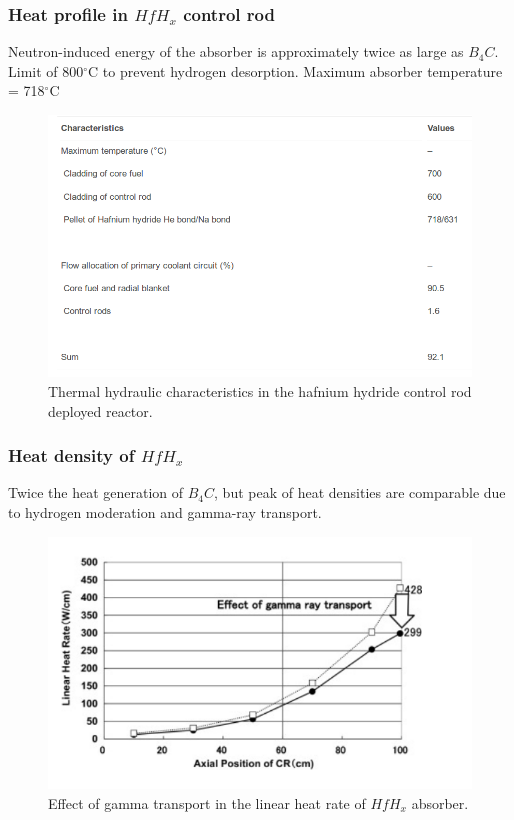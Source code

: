 \documentclass[9pt]{beamer}
\newcommand{\hfh}{$HfH_{x}$\xspace}
\newcommand{\bc}{$B_4C$\xspace}
\begin{document}
\begin{frame}
\frametitle{Heat profile in \hfh  control rod}
Neutron-induced energy of the absorber is approximately twice as large as \bc.
Limit of 800$^\circ$C to prevent hydrogen desorption.
Maximum absorber temperature = 718$^\circ$C
\begin{figure}[htbp!]
  \begin{center}
      \includegraphics[scale=0.28]{./images/th.png}
  \end{center}
  \caption{Thermal hydraulic characteristics in the hafnium hydride control rod deployed reactor.}
  \label{fig:th}
\end{figure}
\end{frame}


\begin{frame}
\frametitle{Heat density of \hfh}
Twice the heat generation of \bc, but peak of heat densities are comparable
due to hydrogen moderation and gamma-ray transport.
\begin{figure}[htbp!]
  \begin{center}
      \includegraphics[scale=0.3]{./images/gamma.png}
  \end{center}
  \caption{Effect of gamma transport in the linear heat rate of \hfh absorber.}
  \label{fig:reac}
\end{figure}
\end{frame}
\end{document}
